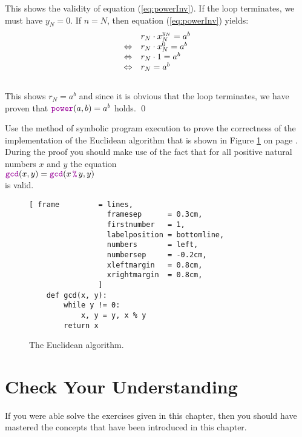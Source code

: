 This shows the validity of equation (\ref{eq:powerInv}).   If the  loop
terminates, we must have $y_N = 0$.  If $n=N$, then equation (\ref{eq:powerInv}) yields:
\\[0.2cm]
\hspace*{1.3cm}
$$
\begin{array}[t]{cl}
                 & r_N \cdot x_N^{y_N} = a^b \\
\Leftrightarrow  & r_N \cdot x_N^{0}  = a^b \\
\Leftrightarrow  & r_N \cdot 1       = a^b \\
\Leftrightarrow  & r_N               = a^b
\end{array}
$$
\\[0.2cm]
This shows $r_N = a^b$ and since it is obvious that the  loop terminates, we have proven that
$\mytt{power}(a,b) =a^b$ holds. \qed

\exercise
Use the method of symbolic program execution to prove the correctness of the implementation of the
Euclidean algorithm that is shown in Figure \ref{fig:gcd.stlx} on page \pageref{fig:gcd.stlx}.  During the proof
you should make use of the fact that for all positive natural numbers $x$ and $y$ the equation
\\[0.2cm]
\hspace*{1.3cm}
$\mytt{gcd}(x, y) = \mytt{gcd}(x \,\mytt{\%}\, y, y)$
\\[0.2cm]
is valid.  

\begin{figure}[!ht]
\centering
\begin{Verbatim}[ frame         = lines, 
                  framesep      = 0.3cm, 
                  firstnumber   = 1,
                  labelposition = bottomline,
                  numbers       = left,
                  numbersep     = -0.2cm,
                  xleftmargin   = 0.8cm,
                  xrightmargin  = 0.8cm,
                ]
    def gcd(x, y):
        while y != 0:
            x, y = y, x % y
        return x
\end{Verbatim}
\vspace*{-0.3cm}
\caption{The Euclidean algorithm.}
\label{fig:gcd.stlx}
\end{figure}
\pagebreak

\section{Check Your Understanding}
If you were able solve the  exercises given in this chapter, then you should have mastered the concepts
that have been introduced in this chapter.


